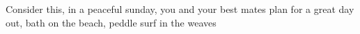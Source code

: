 Consider this, in a peaceful sunday, you and your best mates plan for a great day out, bath on the beach, peddle surf in the weaves  